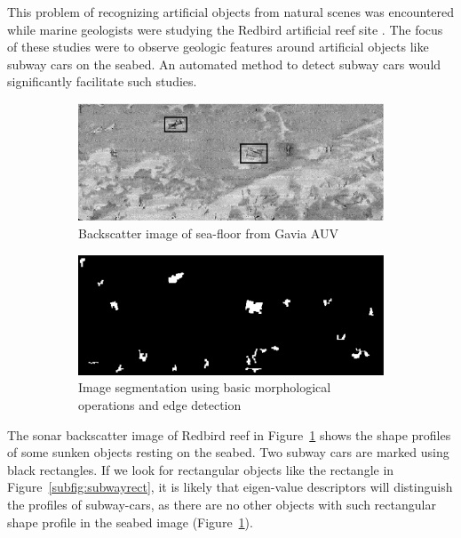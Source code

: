 \documentclass {udthesis}
\begin{document}
This problem of recognizing artificial objects from natural scenes was encountered while marine geologists were studying the Redbird artificial reef site \cite{redbird_nicole, redbird_art}. The focus of these studies were to observe geologic features around artificial objects like subway cars on the seabed. An automated method to detect subway cars would significantly facilitate such studies. 

\begin{figure}
  \begin{subfigure}[]{0.9\textwidth}
      \includegraphics[width=\textwidth]{subwayorig}
      \caption{Backscatter image of sea-floor from Gavia AUV}
      \label{subfig:subwayorig}
  \end{subfigure}
  \begin{subfigure}[]{0.9\textwidth}
      \includegraphics[width=\textwidth]{subwaysegment}
      \caption{Image segmentation using basic morphological operations and edge detection}
      \label{subfig:subwaysegment}
  \end{subfigure}
\caption[Analysis of sonar backscatter image of Redbird reef]{}
\end{figure}

The sonar backscatter image of Redbird reef in Figure~\ref{subfig:subwayorig} shows the shape profiles of some sunken objects resting on the seabed. Two subway cars are marked using black rectangles. If we look for rectangular objects like the rectangle in Figure~\ref{subfig:subwayrect}, it is likely that eigen-value descriptors will distinguish the profiles of subway-cars, as there are no other objects with such rectangular shape profile in the seabed image (Figure~\ref{subfig:subwayorig}). 
\end{document}
